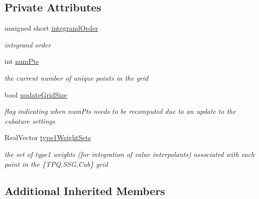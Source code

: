 \subsection*{Private Attributes}
\begin{DoxyCompactItemize}
\item 
unsigned short \hyperlink{classPecos_1_1CubatureDriver_a2daa6f441a3b1848d716e80df5ff2f01}{integrand\+Order}\label{classPecos_1_1CubatureDriver_a2daa6f441a3b1848d716e80df5ff2f01}

\begin{DoxyCompactList}\small\item\em integrand order \end{DoxyCompactList}\item 
int \hyperlink{classPecos_1_1CubatureDriver_ad90387d39d501e7fda7bb777fd5b218f}{num\+Pts}\label{classPecos_1_1CubatureDriver_ad90387d39d501e7fda7bb777fd5b218f}

\begin{DoxyCompactList}\small\item\em the current number of unique points in the grid \end{DoxyCompactList}\item 
bool \hyperlink{classPecos_1_1CubatureDriver_a467d131ddb4afdf1aaf1e51ce80d7c34}{update\+Grid\+Size}\label{classPecos_1_1CubatureDriver_a467d131ddb4afdf1aaf1e51ce80d7c34}

\begin{DoxyCompactList}\small\item\em flag indicating when num\+Pts needs to be recomputed due to an update to the cubature settings \end{DoxyCompactList}\item 
Real\+Vector \hyperlink{classPecos_1_1CubatureDriver_a5f380207cc4a07db88fe31b3a88b6029}{type1\+Weight\+Sets}\label{classPecos_1_1CubatureDriver_a5f380207cc4a07db88fe31b3a88b6029}

\begin{DoxyCompactList}\small\item\em the set of type1 weights (for integration of value interpolants) associated with each point in the \{T\+PQ,S\+SG,Cub\} grid \end{DoxyCompactList}\end{DoxyCompactItemize}
\subsection*{Additional Inherited Members}


